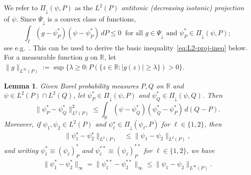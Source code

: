 \documentclass[a4paper]{article}
\newcommand{\R}{\mathbb{R}}
\newcommand{\norm}[1]{\|{#1}\|}
\newtheorem{lemma}[theorem]{Lemma}
\theoremstyle{definition}
\begin{document}
We refer to $\Pi_\downarrow(\psi, P)$ as the \emph{$L^2(P)$ antitonic \emph{(decreasing isotonic)} projection} of $\psi$. Since $\Psi_\downarrow$ is a convex class of functions,
\begin{equation}
\label{eq:iso-ipr}
\int_I (g - \psi_P^*)(\psi - \psi_P^*)\,dP \leq 0 \;\;\text{for all }g \in \Psi_\downarrow \text{ and }\psi_P^* \in \Pi_\downarrow(\psi, P);
\end{equation}
see e.g.~\citet[Theorem~9.36]{samworth24modern}. This can be used to derive the basic inequality~\eqref{eq:L2-proj-ineq} below. For a measurable function $g$ on $\R$, let $\norm{g}_{L^\infty(P)} := \sup\bigl\{\lambda \geq 0 : P(\{z \in \R : |g(z)| \geq \lambda\}) > 0\bigr\}$.

\begin{lemma}
\label{lem:L2-proj-ineq}
Given Borel probability measures $P,Q$ on $\R$ and $\psi \in L^2(P) \cap L^2(Q)$, let $\psi_P^* \in \Pi_\downarrow(\psi, P)$ and $\psi_Q^* \in \Pi_\downarrow(\psi, Q)$. Then
\begin{equation}
\label{eq:L2-proj-ineq}
\norm{\psi_P^* - \psi_Q^*}_{L^2(P)}^2 \leq \int_\R (\psi - \psi_Q^*)(\psi_Q^* - \psi_P^*)\,d(Q - P).
\end{equation}
Moreover, if $\psi_1,\psi_2 \in L^2(P)$ and $\psi_\ell^\star \in \Pi_\downarrow(\psi_\ell,P)$ for $\ell \in \{1,2\}$, then
\begin{align}
\label{eq:L2-proj-contraction}
\norm{\psi_1^\star - \psi_2^\star}_{L^2(P)} &\leq \norm{\psi_1 - \psi_2}_{L^2(P)},
\end{align}
and writing $\psi_\ell^* \equiv (\psi_\ell)_P^*$ and $\psi_\ell^{**} \equiv (\psi_\ell)_P^{**}$ for $\ell \in \{1,2\}$, we have
\begin{align}
\label{eq:Linfty-proj-contraction}
\norm{\psi_1^* - \psi_2^*}_\infty = \norm{\psi_1^{**} - \psi_2^{**}}_\infty \leq \norm{\psi_1 - \psi_2}_{L^\infty(P)}.
\end{align}
\end{lemma}
\end{document}

